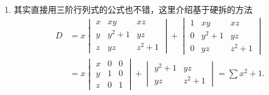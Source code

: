 \begin{exercise}
\begin{exgroup}
\begin{answer}
\begin{enumerate}
                \item 其实直接用三阶行列式的公式也不错，这里介绍基于硬拆的方法
                      \begin{align*}
                          D & =x\begin{vmatrix}
                                    x & xy    & xz    \\
                                    y & y^2+1 & yz    \\
                                    z & yz    & z^2+1
                                \end{vmatrix}+\begin{vmatrix}
                                                  1 & xy    & xz    \\
                                                  0 & y^2+1 & yz    \\
                                                  0 & yz    & z^2+1
                                              \end{vmatrix} \\
                            & =x\begin{vmatrix}
                                    x & 0 & 0 \\
                                    y & 1 & 0 \\
                                    z & 0 & 1
                                \end{vmatrix}+\begin{vmatrix}
                                                  y^2+1 & yz    \\
                                                  yz    & z^2+1
                                              \end{vmatrix}
                          =\sum x^2+1.
                      \end{align*}
            \end{enumerate}
        \end{answer}


\end{exgroup}
\end{exercise}

